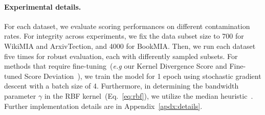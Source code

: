 \paragraph{Experimental details.}
For each dataset, we evaluate scoring performances on different contamination rates.
For integrity across experiments, we fix the data subset size to 700 for WikiMIA and ArxivTection, and 4000 for BookMIA.
Then, we run each dataset five times for robust evaluation, each with differently sampled subsets.
For methods that require fine-tuning~(\textit{e.g} our Kernel Divergence Score and Fine-tuned Score Deviation~\cite{zhang2024fine}), we train the model for 1 epoch using stochastic gradient descent with a batch size of 4.
Furthermore, in determining the bandwidth parameter $\gamma$ in the RBF kernel~(Eq.~\eqref{eq:rbf}), we utilize the median heuristic~\cite{garreau2017large}.
Further implementation details are in Appendix~\ref{apdx:details}.